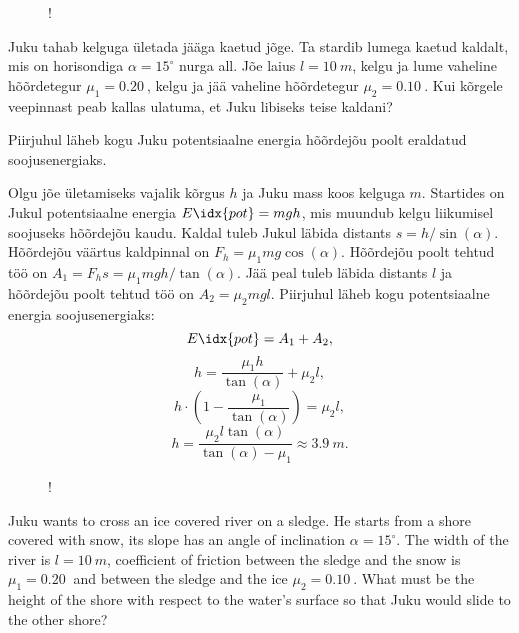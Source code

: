 
\begin{wrapfigure}[2]{r}{0.3\textwidth}
	\vspace{-12pt}
	\begin{resizebox}{\linewidth}{!}{
	}
	\end{resizebox}
\end{wrapfigure}

Juku tahab kelguga ületada jääga kaetud jõge. Ta stardib lumega kaetud kaldalt, mis on horisondiga $\alpha = 15^{\circ}$ nurga all. Jõe laius $l = \SI{10}{m}$, kelgu ja lume vaheline hõõrdetegur $\mu_1 = \SI{0.20}{}$, kelgu ja jää vaheline hõõrdetegur $\mu_2 = \SI{0.10}{}$. Kui kõrgele veepinnast peab kallas ulatuma, et Juku libiseks teise kaldani?

\hint
Piirjuhul läheb kogu Juku potentsiaalne energia hõõrdejõu poolt eraldatud soojusenergiaks.

\solu
Olgu jõe ületamiseks vajalik kõrgus $h$ ja Juku mass koos kelguga $m$. Startides on Jukul potentsiaalne energia $E\idx{pot} = mgh$, mis muundub kelgu liikumisel soojuseks hõõrdejõu kaudu. Kaldal tuleb Jukul läbida distants $s = h/\sin(\alpha)$. Hõõrdejõu väärtus kaldpinnal on $F_h=\mu_1 mg \cos(\alpha)$. Hõõrdejõu poolt tehtud töö on $A_1 = F_h s = {\mu_1}mgh/\tan(\alpha)$. Jää peal tuleb läbida distants $l$ ja hõõrdejõu poolt tehtud töö on $A_2 = {\mu_2}mgl$. Piirjuhul läheb kogu potentsiaalne energia soojusenergiaks:
$$E\idx{pot} = A_1 + A_2,$$
$$h =\frac{\mu_1 h}{\tan(\alpha)} + {\mu_2} l, $$
$$h \cdot \left(1 - \frac{\mu_1}{\tan(\alpha)}\right) = {\mu_2} l,$$
$$h = \frac{\mu_2 l \tan(\alpha)}{\tan(\alpha) - {\mu_1}} \approx \SI{3.9}{m}.$$

\begin{wrapfigure}[2]{r}{0.3\textwidth}
	\vspace{-12pt}
	\begin{resizebox}{\linewidth}{!}{
	}
	\end{resizebox}
\end{wrapfigure}
Juku wants to cross an ice covered river on a sledge. He starts from a shore covered with snow, its slope has an angle of inclination $\alpha = 15^{\circ}$. The width of the river is $l = \SI{10}{m}$, coefficient of friction between the sledge and the snow is $\mu_1 = \SI{0.20}{}$ and between the sledge and the ice $\mu_2 = \SI{0.10}{}$. What must be the height of the shore with respect to the water’s surface so that Juku would slide to the other shore?


